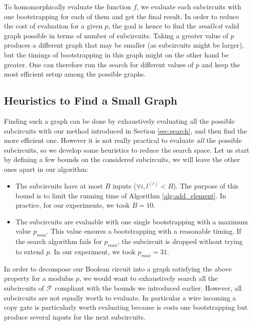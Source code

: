 To homomorphically evaluate the function $f$, we evaluate each subcircuits with one bootstrapping for each of them and get the final result. In order to reduce the cost of evaluation for a given $p$, the goal is hence to find the \emph{smallest} valid graph possible in terms of number of subcircuits. Taking a greater value of $p$ produces a different graph that may be smaller (as subcircuits might be larger), but the timings of bootstrapping in this graph might on the other hand be greater. One can therefore run the search for different values of $p$ and keep the most efficient setup among the possible graphs. %

\subsection{Heuristics to Find a Small Graph}
\label{sec:heuristics_graph}

Finding such a graph can be done by exhaustively evaluating all the possible subcircuits with our method introduced in Section \ref{sec:search}, and then find the more efficient one. However it is not really practical to evaluate \emph{all} the possible subcircuits, so we develop some heuristics to reduce the search space. Let us start by defining a few bounds on the considered subcircuits, we will leave the other ones apart in our algorithm:

\begin{itemize}
    \item The subcircuits have at most $B$ inputs ($\forall i, l^{(i)} < B$). The purpose of this bound is to limit the running time of Algorithm \ref{alg:add_element}. In practice, for our experiments, we took $B = 10$.
    \item The subcircuits are evaluable with one single bootstrapping with a maximum value $p_{max}$. This value ensures a bootstrapping with a reasonable timing. If the search algorithm fails for $p_{max}$, the subcircuit is dropped without trying to extend $p$. In our experiment, we took $p_{max}=31$.
\end{itemize}


In order to decompose our Boolean circuit into a graph satisfying the above property for a modulus $p$, we would want to exhaustively search all the subcircuits of $\mathcal{F}$ compliant with the bounds we introduced earlier. However, all subcircuits are not equally worth to evaluate. In particular a wire incoming a copy gate is particularly worth evaluating because is costs one bootstrapping but produce several inputs for the next subcircuits. 

